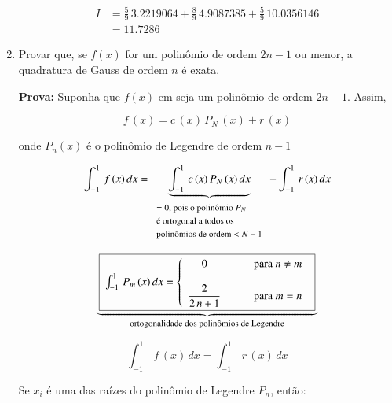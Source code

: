 \begin{enumerate}
\begin{example}
\[
\begin{array}{ll}
 I & = \displaystyle \frac{5}{9} \, 3.2219064 + \frac{8}{9} \, 4.9087385 + \frac{5}{9} \, 10.0356146 \\
   & = 11.7286
\end{array}
\]

\end{example}

\item
Provar que, se $f(x)$ for um polinômio de ordem $2n-1$ ou menor, a quadratura de Gauss de ordem $n$ é exata.

\textbf{Prova:} Suponha que $f(x)$ em  seja um polinômio de ordem $2n-1$. Assim,

\begin{equation}
 \label{cap2:sec6:eq1}
 f\,(x) = c\,(x) \, P_N\,(x) + r\,(x)
\end{equation}

onde $P_{n}(x)$ é o polinômio de Legendre de ordem $n-1$

\begin{equation}
 \label{cap2:sec6:eq2}
 \int_{-1}^1 \, f\,(x)\,dx = \underbrace{\int_{-1}^1 \, c\,(x)\,P_N\,(x)\,dx}_{
  \begin{array}{l}
   \mbox{\footnotesize{$= 0$, pois o polinômio $P_N$}} \\
   \mbox{\footnotesize{é ortogonal a todos os}} \\
   \mbox{\footnotesize{polinômios de ordem $< N-1$}}
  \end{array}
 } + \int_{-1}^1 \, r\,(x)\,dx
\end{equation}

\begin{equation}
 \underbrace{
 \quadricular{
 \label{cap2:sec6:eq3}
 \int_{-1}^1 \, P_m \, (x) \, dx =
 \left\{
  \begin{array}{cl}
   0 & \qquad \mbox{para } n \neq m \\ \\
   \displaystyle \frac{2}{2\,n+1} & \qquad \mbox{para } m = n
  \end{array}
 \right.
 }
 }_{
  \mbox{\footnotesize{ortogonalidade dos polinômios de Legendre}}
 }
\end{equation}

\begin{equation}
 \label{cap2:sec6:eq4}
 \int_{-1}^1 \, f\,(x) \, dx = \int_{-1}^1 \, r\,(x) \, dx 
\end{equation}

Se $x_{i}$ é uma das raízes do polinômio de Legendre $P_{n}$, então:


\end{enumerate}
